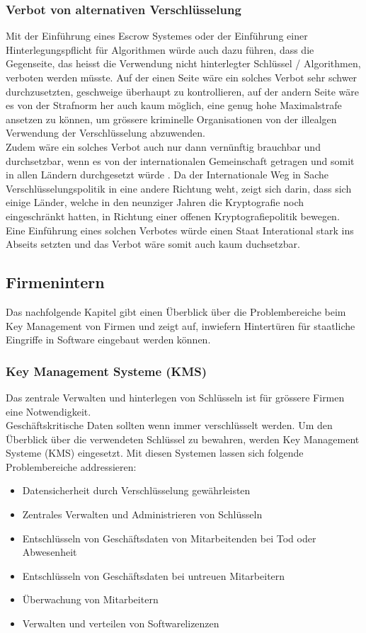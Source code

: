 	
	\subsubsection{Verbot von alternativen Verschlüsselung}
Mit der Einführung eines Escrow Systemes oder der Einführung einer Hinterlegungspflicht für Algorithmen würde auch dazu führen, dass die Gegenseite, das heisst die Verwendung nicht hinterlegter Schlüssel / Algorithmen, verboten werden müsste. Auf der einen Seite wäre ein solches Verbot sehr schwer durchzusetzten, geschweige überhaupt zu kontrollieren, auf der andern Seite wäre es von der Strafnorm her auch kaum möglich, eine genug hohe Maximalstrafe ansetzen zu können, um grössere kriminelle Organisationen von der illealgen Verwendung der Verschlüsselung abzuwenden. \cite{adminch} \\ %
Zudem wäre ein solches Verbot auch nur dann vernünftig brauchbar und durchsetzbar, wenn es von der internationalen Gemeinschaft getragen und somit in allen Ländern durchgesetzt würde \cite{denning}. Da der Internationale Weg in Sache Verschlüsselungspolitik in eine andere Richtung weht, zeigt sich darin, dass sich einige Länder, welche in den neunziger Jahren die Kryptografie noch eingeschränkt hatten, in Richtung einer offenen Kryptografiepolitik bewegen. \cite{clipperchip} \cite{adminch} \\ %
Eine Einführung eines solchen Verbotes würde einen Staat Interational stark ins Abseits setzten und das Verbot wäre somit auch kaum duchsetzbar.
		
	\subsection{Firmenintern}
Das nachfolgende Kapitel gibt einen Überblick über die Problembereiche beim Key Management von Firmen und zeigt auf, inwiefern Hintertüren für staatliche Eingriffe in Software eingebaut werden können.

	\subsubsection{Key Management Systeme (KMS)}
Das zentrale Verwalten und hinterlegen von Schlüsseln ist für grössere Firmen eine Notwendigkeit. \\
Geschäftskritische Daten sollten wenn immer verschlüsselt werden. Um den Überblick über die verwendeten Schlüssel zu bewahren, werden Key Management Systeme (KMS) eingesetzt.
Mit diesen Systemen lassen sich folgende Problembereiche addressieren:
\begin{itemize}
	\item Datensicherheit durch Verschlüsselung gewährleisten
	\item Zentrales Verwalten und Administrieren von Schlüsseln
	\item Entschlüsseln von Geschäftsdaten von Mitarbeitenden bei Tod oder Abwesenheit
	\item Entschlüsseln von Geschäftsdaten bei untreuen Mitarbeitern
  \item Überwachung von Mitarbeitern
  \item Verwalten und verteilen von Softwarelizenzen
\end{itemize}
	

